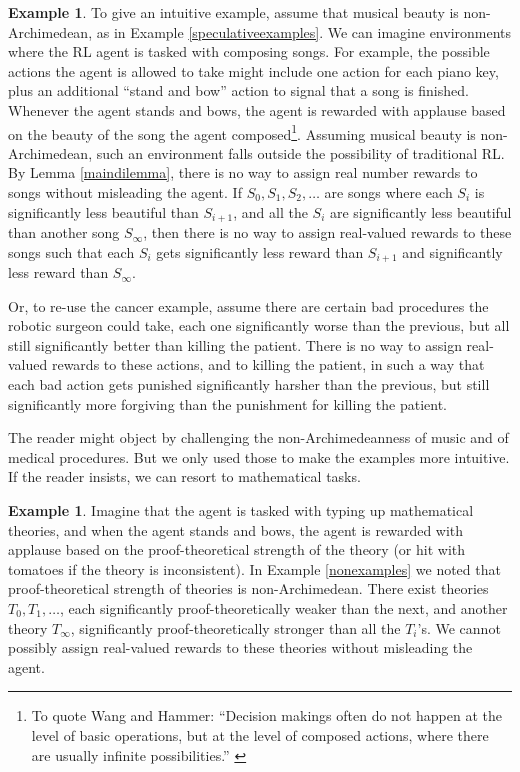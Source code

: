 \documentclass[reqno]{article}
\theoremstyle{definition}
\newtheorem{example}[theorem]{Example}
\begin{document}
\begin{example}
To give an intuitive example, assume that musical beauty is non-Archimedean,
as in Example \ref{speculativeexamples}. We can imagine environments where the
RL agent is tasked with composing songs. For example, the possible actions the
agent is allowed to take might include one action for each piano key, plus
an additional ``stand and bow'' action to signal that a song is
finished.
Whenever the agent stands and bows, the agent is rewarded with applause based on
the beauty of the song the agent
composed\footnote{To quote Wang and Hammer: ``Decision makings often do not happen
at the level of basic operations, but at the level of composed actions, where
there are usually infinite possibilities.'' \cite{wang2015assumptions}}. Assuming
musical beauty is
non-Archimedean, such an environment falls outside the possibility of traditional
RL. By Lemma \ref{maindilemma}, there is no way to assign real number
rewards to songs without misleading the agent. If $S_0,S_1,S_2,\ldots$ are songs
where each $S_{i}$ is significantly less beautiful than $S_{i+1}$, and
all the $S_i$ are significantly less beautiful than another song $S_\infty$,
then there is no way to
assign real-valued rewards to these songs such that each $S_{i}$ gets
significantly less reward than $S_{i+1}$ and significantly less reward
than $S_\infty$.
\end{example}

Or, to re-use the cancer example, assume there are certain bad procedures the
robotic surgeon could take, each one significantly worse than the previous,
but all still significantly better than killing the patient. There is no way
to assign real-valued rewards to these actions, and to killing the patient,
in such a way that each bad action gets punished significantly harsher than
the previous, but still significantly more forgiving than the punishment for
killing the patient.

The reader might object by challenging the non-Archimedeanness
of music and of medical procedures. But we only used those to make the examples
more intuitive. If the reader insists, we can resort to mathematical tasks.

\begin{example}
\label{theoryexample}
Imagine that the agent is tasked with
typing up mathematical theories, and when the agent stands and bows, the agent
is rewarded with applause based on the proof-theoretical strength of the theory
(or hit with tomatoes if the theory is inconsistent).
In Example \ref{nonexamples} we noted that proof-theoretical strength of theories
is non-Archimedean. There exist theories $T_0,T_1,\ldots$, each significantly
proof-theoretically weaker than the next, and another theory $T_\infty$,
significantly proof-theoretically stronger than all the $T_i$'s. We cannot
possibly assign real-valued rewards to these theories without misleading the
agent.
\end{example}
\end{document}

